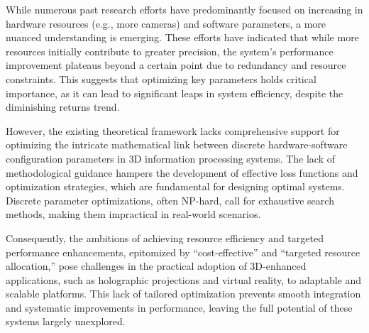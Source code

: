 
While numerous past research efforts have predominantly focused on increasing in hardware resources (e.g., more cameras) and software parameters, a more nuanced understanding is emerging. These efforts have indicated that while more resources initially contribute to greater precision, the system’s performance improvement plateaus beyond a certain point due to redundancy and resource constraints. This suggests that optimizing key parameters holds critical importance, as it can lead to significant leaps in system efficiency, despite the diminishing returns trend.


However, the existing theoretical framework lacks comprehensive support for optimizing the intricate mathematical link between discrete hardware-software configuration parameters in 3D information processing systems. The lack of methodological guidance hampers the development of effective loss functions and optimization strategies, which are fundamental for designing optimal systems. Discrete parameter optimizations, often NP-hard, call for exhaustive search methods, making them impractical in real-world scenarios.


Consequently, the ambitions of achieving resource efficiency and targeted performance enhancements, epitomized by “cost-effective” and “targeted resource allocation,” pose challenges in the practical adoption of 3D-enhanced applications, such as holographic projections and virtual reality, to adaptable and scalable platforms. This lack of tailored optimization prevents smooth integration and systematic improvements in performance, leaving the full potential of these systems largely unexplored.


